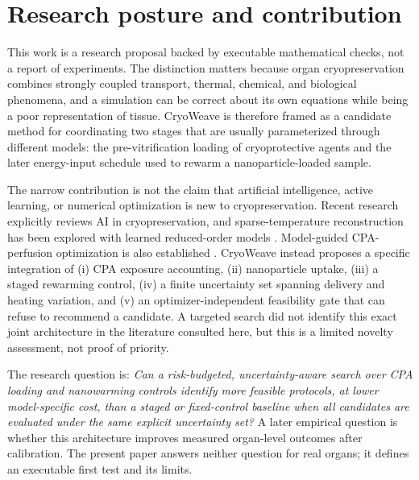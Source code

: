 \documentclass[11pt]{article}
\begin{document}
\section{Research posture and contribution}

This work is a research proposal backed by executable mathematical checks, not a report of experiments. The distinction matters because organ cryopreservation combines strongly coupled transport, thermal, chemical, and biological phenomena, and a simulation can be correct about its own equations while being a poor representation of tissue. CryoWeave is therefore framed as a candidate method for coordinating two stages that are usually parameterized through different models: the pre-vitrification loading of cryoprotective agents and the later energy-input schedule used to rewarm a nanoparticle-loaded sample.

The narrow contribution is not the claim that artificial intelligence, active learning, or numerical optimization is new to cryopreservation. Recent research explicitly reviews AI in cryopreservation, and sparse-temperature reconstruction has been explored with learned reduced-order models \cite{LeiAI2026,SunTemp2026}. Model-guided CPA-perfusion optimization is also established \cite{HanPerfusion2023}. CryoWeave instead proposes a specific integration of (i) CPA exposure accounting, (ii) nanoparticle uptake, (iii) a staged rewarming control, (iv) a finite uncertainty set spanning delivery and heating variation, and (v) an optimizer-independent feasibility gate that can refuse to recommend a candidate. A targeted search did not identify this exact joint architecture in the literature consulted here, but this is a limited novelty assessment, not proof of priority.

The research question is: \emph{Can a risk-budgeted, uncertainty-aware search over CPA loading and nanowarming controls identify more feasible protocols, at lower model-specific cost, than a staged or fixed-control baseline when all candidates are evaluated under the same explicit uncertainty set?} A later empirical question is whether this architecture improves measured organ-level outcomes after calibration. The present paper answers neither question for real organs; it defines an executable first test and its limits.
\end{document}
